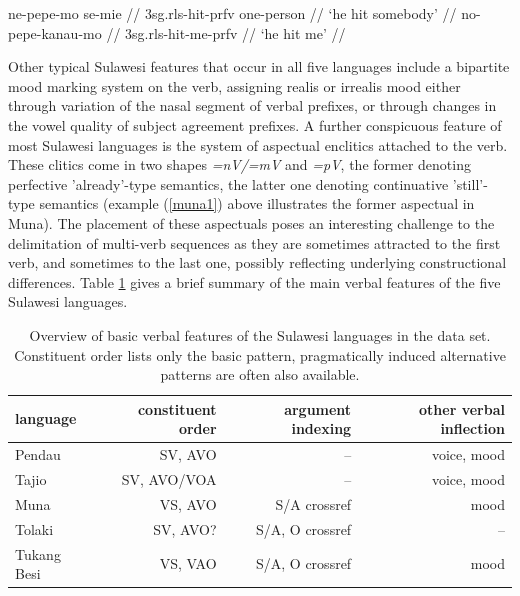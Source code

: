 \pex \label{muna1}
\a
\begingl
\gla ne-pepe-mo se-mie // 
\glb \acs{3}\acs{sg}.\acs{rls}-hit-\acs{prfv} one-person //
\glft `he hit somebody' // 
\endgl
\a
\begingl
\gla no-pepe-kanau-mo // 
\glb \acs{3}\acs{sg}.\acs{rls}-hit-me-\acs{prfv} //
\glft `he hit me' // 
\endgl
\xe

Other typical Sulawesi features that occur in all five languages include a bipartite mood marking system on the verb, assigning realis or irrealis mood either through variation of the nasal segment of verbal prefixes, or through changes in the vowel quality of subject agreement prefixes. A further conspicuous feature of most Sulawesi languages is the system of aspectual enclitics attached to the verb. These clitics come in two shapes \textit{=nV/=mV} and \textit{=pV}, the former denoting perfective 'already'-type semantics, the latter one denoting continuative 'still'-type semantics (example (\ref{muna1}) above illustrates the former aspectual in Muna). The placement of these aspectuals poses an interesting challenge to the delimitation of multi-verb sequences as they are sometimes attracted to the first verb, and sometimes to the last one, possibly reflecting underlying constructional differences. Table \ref{table:overviewsulawesi} gives a brief summary of the main verbal features of the five Sulawesi languages.

\begin{table}
\begin{center}
\begin{footnotesize}
\begin{tabular}{l r r r}
\hline\hline
language & constituent order & argument indexing & other verbal inflection \tabularnewline
\hline
Pendau & SV, AVO & -- & voice, mood \tabularnewline
Tajio & SV, AVO/VOA & -- & voice, mood \tabularnewline
\hline
Muna & VS, AVO & S/A crossref & mood \tabularnewline
Tolaki & SV, AVO? & S/A, O crossref & -- \tabularnewline
Tukang Besi & VS, VAO & S/A, O crossref & mood \tabularnewline
\hline
\end{tabular}
\caption[Basic verbal features of the Sulawesi languages]{Overview of basic verbal features of the Sulawesi languages in the data set. Constituent order lists only the basic pattern, pragmatically induced alternative patterns are often also available.}
\label{table:overviewsulawesi}
\end{footnotesize}
\end{center}
\end{table}
\


